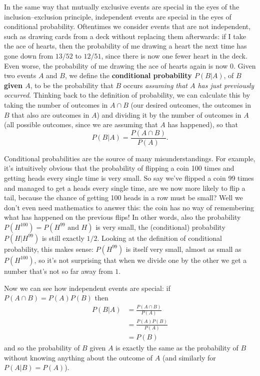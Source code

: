 \documentclass[fleqn,a4paper]{article}
\theoremstyle{definition}
\theoremstyle{definition}
\theoremstyle{definition}
\theoremstyle{definition}
\theoremstyle{remark}
\begin{document}
In the same way that mutually exclusive events are special in the eyes of the inclusion--exclusion principle, independent events are special in the eyes of conditional probability.
Oftentimes we consider events that are not independent, such as drawing cards from a deck without replacing them afterwards: if I take the ace of hearts, then the probability of me drawing a heart the next time has gone down from \(13/52\) to \(12/51\), since there is now one fewer heart in the deck.
Even worse, the probability of me drawing the ace of hearts again is now \(0\).
Given two events \(A\) and \(B\), we define the \textbf{conditional probability \(P(B|A)\)}, of \textbf{\(B\) given \(A\)}, to be the probability that \(B\) occurs \emph{assuming that \(A\) has just previously occurred}.
Thinking back to the definition of probability, we can calculate this by taking the number of outcomes in \(A\cap B\) (our desired outcomes, the outcomes in \(B\) that also are outcomes in \(A\)) and dividing it by the number of outcomes in \(A\) (all possible outcomes, since we are assuming that \(A\) has happened), so that
\[
  P(B|A)
  = \frac{P(A\cap B)}{P(A)}.
\]

Conditional probabilities are the source of many misunderstandings.
For example, it's intuitively obvious that the probability of flipping a coin 100 times and getting heads every single time is very small.
So say we've flipped a coin 99 times and managed to get a heads every single time, are we now more likely to flip a tail, because the chance of getting 100 heads in a row must be small?
Well we don't even need mathematics to answer this: the coin has no way of remembering what has happened on the previous flips!
In other words, also the probability \(P(H^{100})=P(H^{99}\text{ and }H)\) is very small, the (conditional) probability \(P(H|H^{99})\) is still exactly \(1/2\).
Looking at the definition of conditional probability, this makes sense: \(P(H^{99})\) is itself very small, almost as small as \(P(H^{100})\), so it's not surprising that when we divide one by the other we get a number that's not so far away from \(1\).

Now we can see how independent events are special: if \(P(A\cap B)=P(A)P(B)\) then
\[
  \begin{aligned}
    P(B|A)
    &= \frac{P(A\cap B)}{P(A)}
  \\&= \frac{P(A)P(B)}{P(A)}
  \\&= P(B)
  \end{aligned}
\]
and so the probability of \(B\) given \(A\) is exactly the same as the probability of \(B\) without knowing anything about the outcome of \(A\) (and similarly for \(P(A|B)=P(A)\)).
\end{document}
